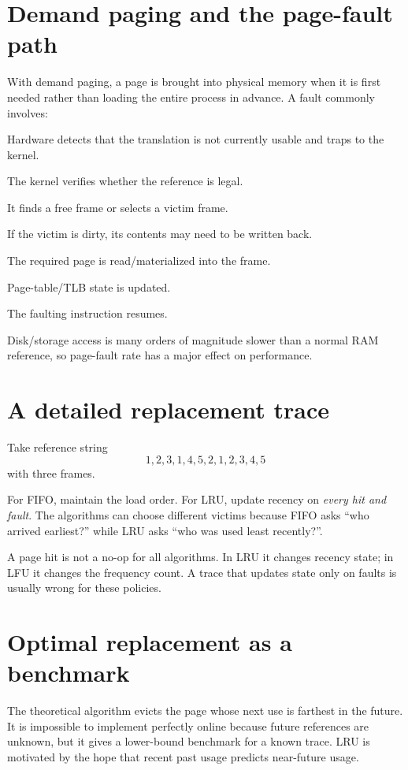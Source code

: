 \section{Demand paging and the page-fault path}
With demand paging, a page is brought into physical memory when it is first needed rather than loading the entire process in advance. A fault commonly involves:
\begin{mlsteps}
  \item Hardware detects that the translation is not currently usable and traps to the kernel.
  \item The kernel verifies whether the reference is legal.
  \item It finds a free frame or selects a victim frame.
  \item If the victim is dirty, its contents may need to be written back.
  \item The required page is read/materialized into the frame.
  \item Page-table/TLB state is updated.
  \item The faulting instruction resumes.
\end{mlsteps}
Disk/storage access is many orders of magnitude slower than a normal RAM reference, so page-fault rate has a major effect on performance.

\section{A detailed replacement trace}
Take reference string
\[
1,2,3,1,4,5,2,1,2,3,4,5
\]
with three frames.

For FIFO, maintain the load order. For LRU, update recency on \emph{every hit and fault}. The algorithms can choose different victims because FIFO asks ``who arrived earliest?'' while LRU asks ``who was used least recently?''.

\begin{keyidea}
A page hit is not a no-op for all algorithms. In LRU it changes recency state; in LFU it changes the frequency count. A trace that updates state only on faults is usually wrong for these policies.
\end{keyidea}

\section{Optimal replacement as a benchmark}
The theoretical  algorithm evicts the page whose next use is farthest in the future. It is impossible to implement perfectly online because future references are unknown, but it gives a lower-bound benchmark for a known trace. LRU is motivated by the hope that recent past usage predicts near-future usage.

